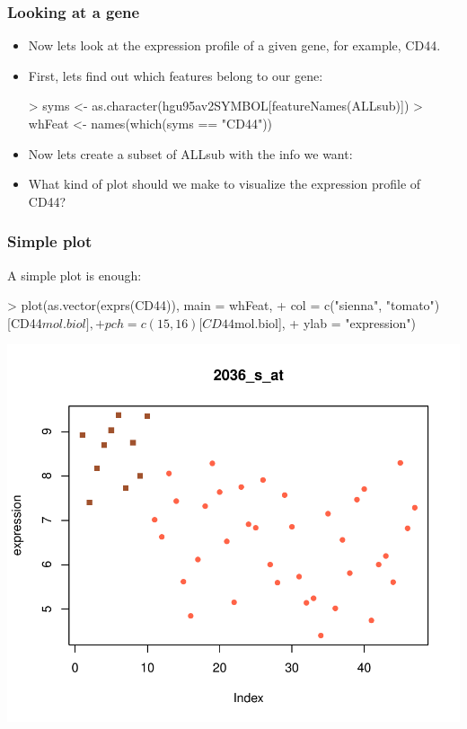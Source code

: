 \begin{frame}
  \frametitle{Looking at a gene}
  \begin{itemize}
  \item Now lets look at the expression profile of a given gene, for example, CD44.
  \item First, lets find out which features belong to our gene:
\begin{Schunk}
\begin{Sinput}
> syms <- as.character(hgu95av2SYMBOL[featureNames(ALLsub)])
> whFeat <- names(which(syms == "CD44"))
\end{Sinput}
\end{Schunk}
  \item Now lets create a subset of ALLsub with the info we want:
\begin{Schunk}
\end{Schunk}
  \item What kind of plot should we make to visualize the expression profile of CD44?
  \end{itemize}
\end{frame}

\begin{frame}
  \frametitle{Simple plot}
  A simple plot is enough:
\begin{Schunk}
\begin{Sinput}
> plot(as.vector(exprs(CD44)), main = whFeat, 
+     col = c("sienna", "tomato")[CD44$mol.biol], 
+     pch = c(15, 16)[CD44$mol.biol], 
+     ylab = "expression")
\end{Sinput}
\end{Schunk}
\includegraphics{plots/fig-016}
\end{frame}

